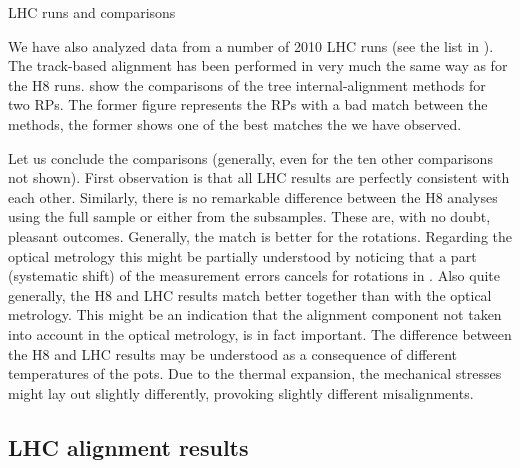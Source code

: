 \caption{LHC runs and comparisons}

We have also analyzed data from a number of 2010 LHC runs (see the list in ). The track-based alignment has been performed in very much the same way as for the H8 runs.  show the comparisons of the tree internal-alignment methods for two RPs. The former figure represents the RPs with a bad match between the methods, the former shows one of the best matches the we have observed.



Let us conclude the comparisons (generally, even for the ten other comparisons not shown). First observation is that all LHC results are perfectly consistent with each other. Similarly, there is no remarkable difference between the H8 analyses using the full sample or either from the subsamples. These are, with no doubt, pleasant outcomes. Generally, the match is better for the rotations. Regarding the optical metrology this might be partially understood by noticing that a part (systematic shift) of the measurement errors cancels for rotations in . Also quite generally, the H8 and LHC results match better together than with the optical metrology. This might be an indication that the alignment component not taken into account in the optical metrology, is in fact important. The difference between the H8 and LHC results may be understood as a consequence of different temperatures of the pots. Due to the thermal expansion, the mechanical stresses might lay out slightly differently, provoking slightly different misalignments.


\subsection[al lhc res]{LHC alignment results}

